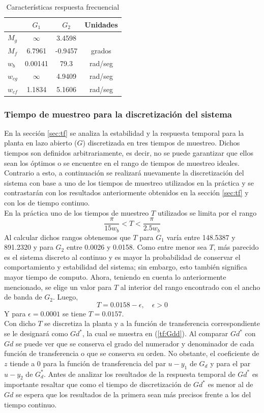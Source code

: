 \documentclass[journal]{IEEEtran}
\begin{document}
\begin{table}[!h]
\centering
\caption{Características respuesta frecuencial}
\label{tab:freq}
\begin{tabular}{@{}lccc@{}}
\toprule
                  & $G_1$ & $G_2$ & Unidades         \\ \midrule
$M_g$ & $\infty$ & 3.4598 & \\
$M_f$ & 6.7961 & -0.9457 & grados\\
$w_b$ & 0.00141 & 79.3 & rad/seg\\
$w_{cg}$ & $\infty$ & 4.9409 & rad/seg\\
$w_{cf}$ & 1.1834 & 5.1606 & rad/seg\\
                 \bottomrule
\end{tabular}
\end{table}

\subsubsection{Tiempo de muestreo para la discretización del sistema}
En la sección \ref{sec:tf} se analiza la estabilidad y la respuesta temporal para la planta en lazo abierto ($G$) discretizada en tres tiempos de muestreo. Dichos tiempos son definidos arbitrariamente, es decir, no se puede garantizar que ellos sean los óptimos o se encuentre en el rango de tiempos de muestreo ideales. Contrario a esto, a continuación se realizará nuevamente la discretización del sistema con base a uno de los tiempos de muestreo utilizados en la práctica y se contrastarán con los resultados anteriormente obtenidos en la sección \ref{sec:tf} y con los de tiempo continuo.\\

En la práctica uno de los tiempos de muestreo $T$ utilizados se limita por el rango $$\frac{\pi}{15w_b}<T<\frac{\pi}{2.5w_b}$$
Al calcular dichos rangos obtenemos que $T$ para $G_1$ varía entre 148.5387 y 891.2320 y para $G_2$ entre 0.0026 y 0.0158. Como entre menor sea $T$, más parecido es el sistema discreto al continuo y es mayor la probabilidad de conservar el comportamiento y estabilidad del sistema; sin embargo, esto también significa mayor tiempo de computo. Ahora, teniendo en cuenta lo anteriormente mencionado, se elige un valor para $T$ al interior del rango encontrado con el ancho de banda de $G_2$. Luego, $$T=0.0158-\epsilon, \quad \epsilon>0$$
Y para $\epsilon=0.0001$ se tiene $T=0.0157$.\\

Con dicho $T$ se discretiza la planta y a la función de transferencia correspondiente se le designará como $Gd^*$, la cual se muestra en (\ref{tf:Gdd}). Al comparar $Gd^*$ con $Gd$ se puede ver que se conserva el grado del numerador y denominador de cada función de transferencia o que se conserva su orden. No obstante, el coeficiente de $z$ tiende a 0 para la función de transferencia del par $u-y_1$ de $G_d$ y para el par $u-y_2$ de $G_d^*$. Antes de analizar los resultados de la respuesta temporal de $Gd^*$ es importante resaltar que como el tiempo de discretización de $Gd^*$ es menor al de $Gd$ se espera que los resultados de la primera sean más precisos frente a los del tiempo continuo.   
\end{document}
